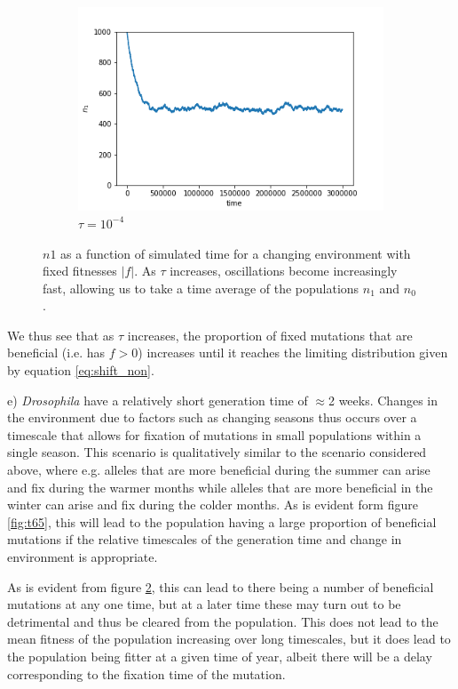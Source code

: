 \documentclass{article}
\begin{document}
\begin{figure}[h]
\begin{subfigure}[t]{0.24\linewidth}
		\includegraphics[width = 1.0\linewidth, trim={0 0 0 0}, clip=true]{figures/tau5e3_selection_trajec.png}
		\caption{$\tau = 10^{-4}$}
		\label{fig:t4}
	\end{subfigure}

\caption{$n1$ as a function of simulated time for a changing environment with fixed fitnesses $|f|$. As $\tau$ increases, oscillations become increasingly fast, allowing us to take a time average of the populations $n_1$ and $n_0$.}
\label{fig:changing_constant_trajecs}
\end{figure}

We thus see that as $\tau$ increases, the proportion of fixed mutations that are beneficial (i.e. has $f > 0$) increases until it reaches the limiting distribution given by equation \ref{eq:shift_non}.

e)
\textit{Drosophila} have a relatively short generation time of $\approx$2 weeks. Changes in the environment due to factors such as changing seasons thus occurs over a timescale that allows for fixation of mutations in small populations within a single season. This scenario is qualitatively similar to the scenario considered above, where e.g. alleles that are more beneficial during the summer can arise and fix during the warmer months while alleles that are more beneficial in the winter can arise and fix during the colder months. As is evident form figure \ref{fig:t65}, this will lead to the population having a large proportion of beneficial mutations if the relative timescales of the generation time and change in environment is appropriate.

As is evident from figure \ref{fig:changing_constant_trajecs}, this can lead to there being a number of beneficial mutations at any one time, but at a later time these may turn out to be detrimental and thus be cleared from the population. This does not lead to the mean fitness of the population increasing over long timescales, but it does lead to the population being fitter at a given time of year, albeit there will be a delay corresponding to the fixation time of the mutation.
\end{document}
